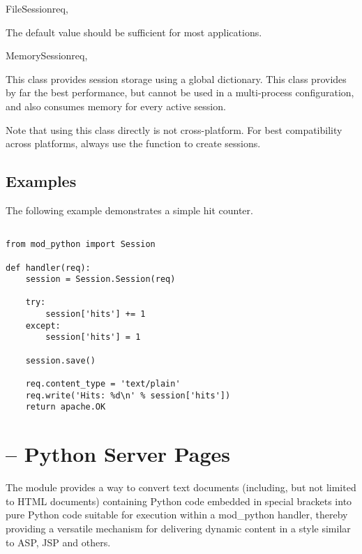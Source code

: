 \begin{classdesc}{FileSession}{req, }
\begin{itemize}
    The default value should be sufficient for most applications.
  \end{itemize}

\end{classdesc}

\begin{classdesc}{MemorySession}{req, }

  This class provides session storage using a global dictionary. This
  class provides by far the best performance, but cannot be used in a
  multi-process configuration, and also consumes memory for every
  active session.

  Note that using this class directly is not cross-platform. For best
  compatibility across platforms, always use the 
  function to create sessions.

\end{classdesc}

\subsection{Examples\label{pyapi-sess-example}}
The following example demonstrates a simple hit counter.

    \begin{verbatim}

from mod_python import Session

def handler(req):
    session = Session.Session(req)

    try:
        session['hits'] += 1
    except:
        session['hits'] = 1

    session.save()

    req.content_type = 'text/plain'
    req.write('Hits: %d\n' % session['hits'])
    return apache.OK 
    \end{verbatim}

\section{ -- Python Server Pages\label{pyapi-psp}}

The  module provides a way to convert text documents
(including, but not limited to HTML documents) containing Python code
embedded in special brackets into pure Python code suitable for
execution within a mod_python handler, thereby providing a versatile
mechanism for delivering dynamic content in a style similar to ASP,
JSP and others.

